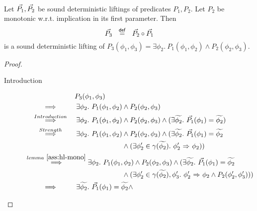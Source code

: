 \begin{lemma}~\\
    \label{lemma:det-lift-comp}
    Let $\vec{P_1}, \vec{P_2}$ be sound deterministic liftings of predicates $P_1, P_2$.
    Let $P_2$ be monotonic w.r.t. implication in its first parameter.
    Then
    \begin{displaymath}
    \vec{P_3} ~~\overset{\textup{\textmd{\textsf{def}}}}{=}~~ \vec{P_2} \circ \vec{P_1}
    \end{displaymath}
    is a sound deterministic lifting of $P_3(\phi_1, \phi_3) = \exists \phi_2.~ P_1(\phi_1, \phi_2) \wedge P_2(\phi_2, \phi_3)$.
\end{lemma}
\begin{proof}~
    \begin{description}
        \item[Introduction]
        \begin{align*}
        & \phantom{\overset{}{~\quad\quad\implies\quad\quad~}}~
        P_3(\phi_1, \phi_3)\\
        & \overset{}{~\quad\quad\implies\quad\quad~} 
        \exists \phi_2.~ P_1(\phi_1, \phi_2) \wedge P_2(\phi_2, \phi_3)\\
        & \overset{Introduction}{~\quad\quad\implies\quad\quad~} 
        \exists \phi_2.~ P_1(\phi_1, \phi_2) \wedge P_2(\phi_2, \phi_3)
        \wedge (\exists \grad{\phi_2}.~ \dgrad{P_1}(\phi_1) = \grad{\phi_2})\\
        & \overset{Strength}{~\quad\quad\implies\quad\quad~} 
        \exists \phi_2.~ P_1(\phi_1, \phi_2) \wedge P_2(\phi_2, \phi_3)
        \wedge (\exists \grad{\phi_2}.~ \dgrad{P_1}(\phi_1) = \grad{\phi_2} \\
        & \quad\quad\quad\quad\quad\quad\quad\quad\quad\quad\quad\quad\quad\quad
        \wedge 
        (\exists \phi_2' \in \gamma(\grad{\phi_2}).~ \phiImplies{\phi_2'}{\phi_2}))\\
        & \overset{lemma~\ref{ass:hl-mono}}{~\quad\quad\implies\quad\quad~} 
        \exists \phi_2.~ P_1(\phi_1, \phi_2) \wedge P_2(\phi_2, \phi_3)
        \wedge (\exists \grad{\phi_2}.~ \dgrad{P_1}(\phi_1) = \grad{\phi_2} \\
        & \quad\quad\quad\quad\quad\quad\quad\quad\quad\quad\quad\quad\quad\quad
        \wedge 
        (\exists \phi_2' \in \gamma(\grad{\phi_2}), \phi_3'.~ \phiImplies{\phi_2'}{\phi_2} \wedge P_2(\phi_2', \phi_3')))\\
        & \overset{}{~\quad\quad\implies\quad\quad~} 
        \exists \grad{\phi_2}.~ \dgrad{P_1}(\phi_1) = \grad{\phi_2} \wedge 

\end{align*}
\end{description}
\end{proof}
